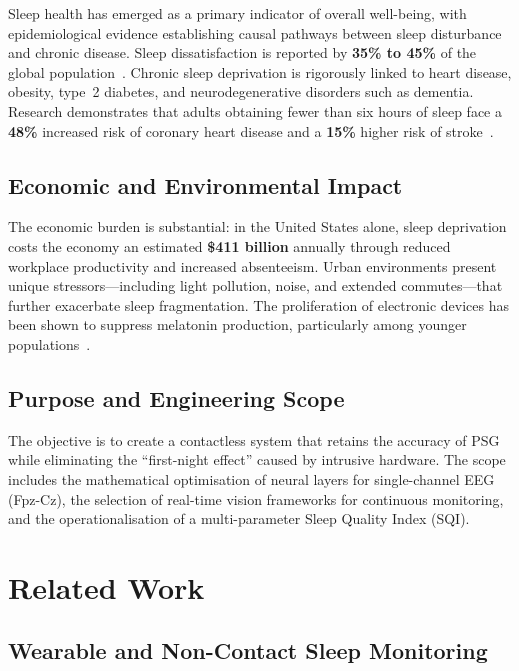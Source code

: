 \documentclass[10pt, a4paper, twocolumn]{article}
\begin{document}
Sleep health has emerged as a primary indicator of overall well-being, with
epidemiological evidence establishing causal pathways between sleep disturbance and
chronic disease. Sleep dissatisfaction is reported by \textbf{35\% to 45\%} of the
global population~\cite{ref1}. Chronic sleep deprivation is rigorously linked to heart
disease, obesity, type~2 diabetes, and neurodegenerative disorders such as dementia.
Research demonstrates that adults obtaining fewer than six hours of sleep face a
\textbf{48\%} increased risk of coronary heart disease and a \textbf{15\%} higher
risk of stroke~\cite{ref2}.

\subsection{Economic and Environmental Impact}

The economic burden is substantial: in the United States alone, sleep deprivation
costs the economy an estimated \textbf{\$411 billion} annually through reduced
workplace productivity and increased absenteeism. Urban environments present unique
stressors---including light pollution, noise, and extended commutes---that further
exacerbate sleep fragmentation. The proliferation of electronic devices has been shown
to suppress melatonin production, particularly among younger populations~\cite{ref4}.

\subsection{Purpose and Engineering Scope}

The objective is to create a contactless system that retains the accuracy of PSG while
eliminating the ``first-night effect'' caused by intrusive hardware. The scope includes
the mathematical optimisation of neural layers for single-channel EEG (Fpz-Cz), the
selection of real-time vision frameworks for continuous monitoring, and the
operationalisation of a multi-parameter Sleep Quality Index (SQI).

\section{Related Work}

\subsection{Wearable and Non-Contact Sleep Monitoring}
\end{document}
